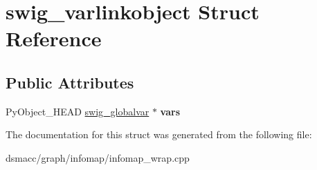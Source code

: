 \hypertarget{structswig__varlinkobject}{}\section{swig\+\_\+varlinkobject Struct Reference}
\label{structswig__varlinkobject}
\subsection*{Public Attributes}
\begin{DoxyCompactItemize}
\item 
\mbox{\label{structswig__varlinkobject_a8cf96d999cdf0b28a0e90ccb6804c9bd}} 
Py\+Object\+\_\+\+H\+E\+AD \mbox{\hyperlink{structswig__globalvar}{swig\+\_\+globalvar}} $\ast$ {\bfseries vars}
\end{DoxyCompactItemize}


The documentation for this struct was generated from the following file\+:\begin{DoxyCompactItemize}
\item 
dsmacc/graph/infomap/infomap\+\_\+wrap.\+cpp\end{DoxyCompactItemize}
